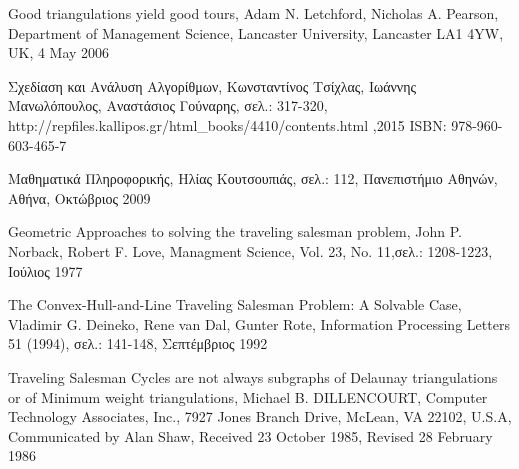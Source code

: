 \documentclass[oneside,12pt]{book}
\theoremstyle{definition}
\begin{document}
\begin{thebibliography}{depth}
	Good triangulations yield good tours,
	Adam N. Letchford, Nicholas A. Pearson,
	Department of Management Science, Lancaster University, Lancaster LA1 4YW, UK,
	4 May 2006

	Σχεδίαση και Ανάλυση Αλγορίθμων,
	Κωνσταντίνος Τσίχλας, Ιωάννης Μανωλόπουλος, Αναστάσιος Γούναρης,
	σελ.: 317-320,
	http://repfiles.kallipos.gr/html\_books/4410/contents.html ,2015
	ISBN: 978-960-603-465-7

	Μαθηματικά Πληροφορικής,
	Ηλίας Κουτσουπιάς,
	σελ.: 112,
	Πανεπιστήμιο Αθηνών, Αθήνα, Οκτώβριος 2009

	Geometric Approaches to solving the traveling salesman problem,
	John P. Norback, Robert F. Love,
	Managment Science, Vol. 23, No. 11,σελ.: 1208-1223,
	Ιούλιος 1977

	The Convex-Hull-and-Line
	Traveling Salesman Problem: A Solvable Case,
	Vladimir G. Deineko, Rene van Dal, Gunter Rote,
	Information Processing Letters 51 (1994), σελ.: 141-148,
	Σεπτέμβριος 1992

	Traveling Salesman Cycles are not always subgraphs of Delaunay triangulations or of Minimum weight triangulations,	Michael B. DILLENCOURT,
	Computer Technology Associates, Inc., 7927 Jones Branch Drive, McLean, VA 22102, U.S.A,
	Communicated by Alan Shaw,
	Received 23 October 1985,
	Revised 28 February 1986

\end{thebibliography}
\end{document}
